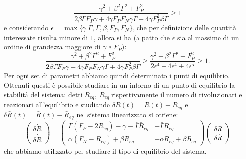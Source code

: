 \begin{equation*}
	\frac{\gamma^2+\beta^2\Gamma^2+F_P^2}{2\beta\Gamma F_P\gamma+4\gamma F_P F_N \gamma{\Gamma}+4\gamma F_P^2\beta \Gamma}\geq1
\end{equation*}
e considerando $\epsilon=\max\{\gamma.\Gamma,\bar{\Gamma},\beta,F_P,F_N\}$, che per definizione delle quantità interessate risulta minore di $1$, allora si ha (a patto che $ \epsilon $ sia al massimo di un ordine di grandezza maggiore di $ \gamma $ e $ F_{P} $):
\begin{equation*}
	\frac{\gamma^2+\beta^2\Gamma^2+F_P^2}{2\beta\Gamma F_P\gamma+4\gamma F_P F_N \gamma{\Gamma}+4\gamma F_P^2\beta \Gamma}\geq\frac{\gamma^2+\beta^2\Gamma^2+F_P^2}{2\epsilon^4+4\epsilon^4+4\epsilon^5}\geq 1.
\end{equation*}
Per ogni set di parametri abbiamo quindi determinato i punti di equilibrio. Ottenuti questi è possibile studiare in un intorno di un punto di equilibrio la stabilità del sistema: detti $R_{eq},\ \bar{R}_{eq}$ rispettivamente il numero di rivoluzionari e reazionari all'equilibrio e studiando $\delta R(t)=R(t)- R_{eq}$ e $\delta \bar{R}(t)=\bar{R}(t)-\bar R_{eq}$ nel sistema linearizzato si ottiene:
\begin{equation}
	\begin{pmatrix}
		\delta \dot{R}\\ 
		\delta \dot{\bar{R}}
	\end{pmatrix}
	=\begin{pmatrix}
		\Gamma(F_P-2R_{eq})-\gamma-\bar{\Gamma} \bar{R}_{eq} & -\bar{\Gamma}R_{eq}\\
		\alpha(F_{N}-\bar{R}_{eq})+\beta \bar{R}_{eq} & -\alpha R_{eq}+\beta R_{eq}
	\end{pmatrix}
	\begin{pmatrix}
		\delta R\\
		\delta \bar{R}
	\end{pmatrix}
\end{equation} 
che abbiamo utilizzato per studiare il tipo di equilibrio del sistema.
